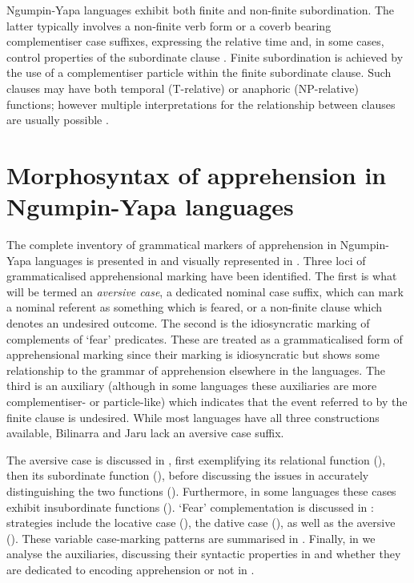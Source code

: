 \documentclass[output=paper,colorlinks,citecolor=brown]{langscibook}
\begin{document}
Ngumpin-Yapa languages exhibit both finite and non-finite subordination. The latter typically involves a non-finite verb form or a coverb bearing complementiser case suffixes, expressing the relative time and, in some cases, control properties of the subordinate clause \citep{simpson_control_1983}. Finite subordination is achieved by the use of a complementiser particle within the finite subordinate clause. Such clauses may have both temporal (T-relative) or anaphoric (NP-relative) functions; however multiple interpretations for the relationship between clauses are usually possible \citep{hale_adjoined_1976}.




\section{Morphosyntax of apprehension in Ngumpin-Yapa languages}
\label{sec:morphosyntax}

The complete inventory of grammatical markers of apprehension in Ngumpin-Yapa languages is presented in  and visually represented in . Three loci of grammaticalised apprehensional marking have been identified. The first is what will be termed an \textit{aversive case}, a dedicated nominal case suffix, which can mark a nominal referent as something which is feared, or a non-finite clause which denotes an undesired outcome. The second is the idiosyncratic marking of complements of `fear' predicates. These are treated as a grammaticalised form of apprehensional marking since their marking is idiosyncratic but shows some relationship to the grammar of apprehension elsewhere in the languages. The third is an auxiliary (although in some languages these auxiliaries are more complementiser- or particle-like) which indicates that the event referred to by the finite clause is undesired. While most languages have all three constructions available, Bilinarra and Jaru lack an aversive case suffix.





The aversive case is discussed in , first exemplifying its relational function (), then its subordinate function (), before discussing the issues in accurately distinguishing the two functions (). Furthermore, in some languages these cases exhibit insubordinate functions (). `Fear' complementation is discussed in : strategies include the locative case (), the dative case (), as well as the aversive (). These variable case-marking patterns are summarised in . Finally, in  we analyse the auxiliaries, discussing their syntactic properties in  and whether they are dedicated to encoding apprehension or not in .
\end{document}
